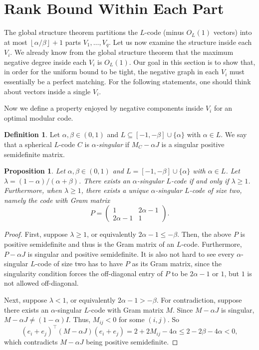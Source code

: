 \documentclass[reqno, 11pt]{amsart}
\newtheorem{proposition}[theorem]{Proposition}
\theoremstyle{definition}
\newtheorem{definition}[theorem]{Definition}
\theoremstyle{remark}
\newcommand{\floor}[1]{\left\lfloor #1 \right\rfloor}
\begin{document}
\section{Rank Bound Within Each Part}\label{sec:rank-bound}

The global structure theorem partitions the $L$-code (minus $O_L(1)$ vectors) into at most $\floor{\alpha/\beta} + 1$ parts $V_1, \dots, V_q$.
Let us now examine the structure inside each $V_i$. 
We already know from the global structure theorem that the maximum negative degree inside each $V_i$ is $O_L(1)$. 
Our goal in this section is to show that, in order for the uniform bound to be tight, the negative graph in each $V_i$ must essentially be a perfect matching. 
For the following statements, one should think about vectors inside a single $V_i$.

Now we define a property enjoyed by negative components inside $V_i$ for an optimal modular code.

\begin{definition}\label{def:a-singular}
Let $ \alpha, \beta \in (0,1)$ and $L \subseteq [-1,-\beta] \cup \{\alpha\}$ with $\alpha \in L$. 
We say that a spherical $L$-code $C$ is \textit{$\alpha$-singular} if $M_C- \alpha J$ is a singular positive semidefinite matrix.
\end{definition}

\begin{proposition}\label{prop:a-singular}
Let $\alpha, \beta \in (0,1)$ and $L = [-1,-\beta] \cup \{\alpha\}$ with $\alpha \in L$.
Let $\lambda = (1-\alpha)/(\alpha + \beta)$. 
There exists an $\alpha$-singular $L$-code if and only if $\lambda \ge 1$. Furthermore, when $\lambda \ge 1$, there exists a unique $\alpha$-singular $L$-code of size two, namely the code with Gram matrix
\[
P = \begin{pmatrix}
            1 & 2\alpha - 1 \\
            2\alpha - 1 & 1
        \end{pmatrix}.
\]
\end{proposition}

\begin{proof}
    First, suppose $\lambda \geq 1$, or equivalently $2\alpha - 1\leq -\beta$. Then, the above $P$ is positive semidefinite and thus is the Gram matrix of an $L$-code. Furthermore, $P - \alpha J$ is singular and positive semidefinite.
    It is also not hard to see every $\alpha$-singular $L$-code of size two has to have $P$ as its Gram matrix, since the singularity condition forces the off-diagonal entry of $P$ to be $2\alpha - 1$ or $1$, but $1$ is not allowed off-diagonal.

    Next, suppose $\lambda < 1$, or equivalently $2\alpha - 1 > -\beta$. For contradiction, suppose there exists an $\alpha$-singular $L$-code with Gram matrix $M$. Since $M - \alpha J$ is singular, $M - \alpha J \neq (1-\alpha) I$. Thus, $M_{ij} < 0$ for some $(i,j)$. 
    So
    \[
        (e_i + e_j)^\intercal (M - \alpha J) (e_i + e_j) = 2 + 2M_{ij} - 4\alpha \leq 2 - 2\beta - 4\alpha < 0,
    \]
    which contradicts $M - \alpha J$ being positive semidefinite.
\end{proof}
\end{document}
